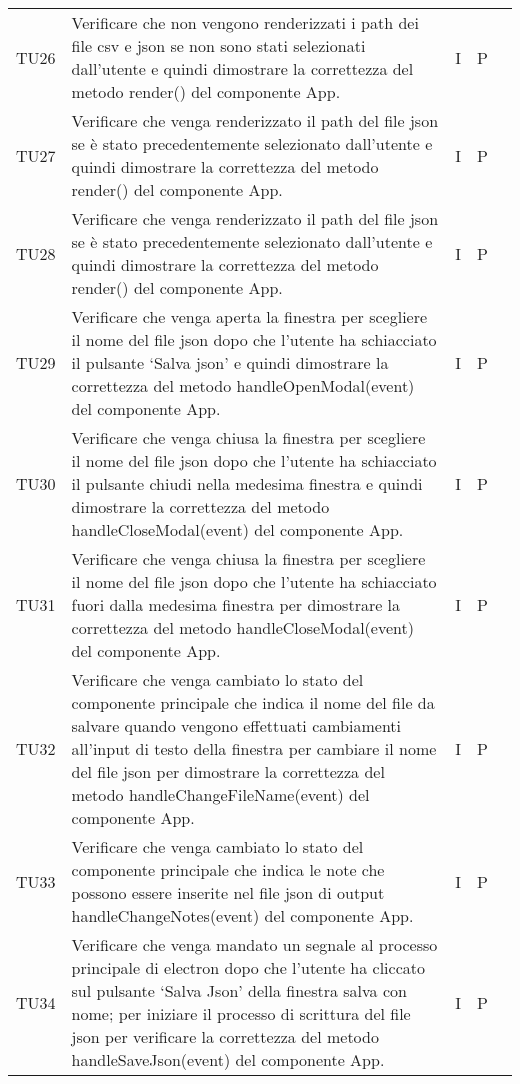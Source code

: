 \begin{longtable} {
		>{}p{15mm} 
		>{}p{79.5mm}
		>{}p{15mm} 
		>{}p{15mm}
		>{}p{0mm}}
	TU26	& Verificare che non vengono renderizzati i path dei file csv e json se non sono stati selezionati dall’utente e quindi dimostrare la correttezza del metodo render() del componente App. & I & P &\TBstrut \\ [2mm]
	TU27	& Verificare che venga renderizzato il path del file json se è stato precedentemente selezionato dall’utente e quindi dimostrare la correttezza del metodo render() del componente App. & I & P &\TBstrut \\ [2mm]
	TU28	& Verificare che venga renderizzato il path del file json se è stato precedentemente selezionato dall’utente e quindi dimostrare la correttezza del metodo render() del componente App. & I & P &\TBstrut \\ [2mm]
	TU29	& Verificare che venga aperta la finestra per scegliere il nome del file json dopo che l’utente ha schiacciato il pulsante ‘Salva json’ e quindi dimostrare la correttezza del metodo handleOpenModal(event) del componente App. & I & P &\TBstrut \\ [2mm]
	TU30	& Verificare che venga chiusa la finestra per scegliere il nome del file json dopo che l’utente ha schiacciato il pulsante chiudi nella medesima finestra e quindi dimostrare la correttezza del metodo handleCloseModal(event) del componente App. & I & P &\TBstrut \\ [2mm]
	TU31	& Verificare che venga chiusa la finestra per scegliere il nome del file json dopo che l’utente ha schiacciato fuori dalla medesima finestra per dimostrare la correttezza del metodo handleCloseModal(event) del componente App. & I & P &\TBstrut \\ [2mm]
	TU32	& Verificare che venga cambiato lo stato del componente principale che indica il nome del file da salvare quando vengono effettuati cambiamenti all'input di testo della finestra per cambiare il nome del file json per dimostrare la correttezza del metodo handleChangeFileName(event) del componente App. & I & P &\TBstrut \\ [2mm]
	TU33	& Verificare che venga cambiato lo stato del componente principale che indica le note che possono essere inserite nel file json di output handleChangeNotes(event) del componente App. & I & P &\TBstrut \\ [2mm]
	TU34	& Verificare che venga mandato un segnale al processo principale di electron dopo che l’utente ha cliccato sul pulsante ‘Salva Json’ della finestra salva con nome; per iniziare il processo di scrittura del file json per verificare la correttezza del metodo handleSaveJson(event) del componente App. & I & P &\TBstrut \\ [2mm]

\end{longtable}
